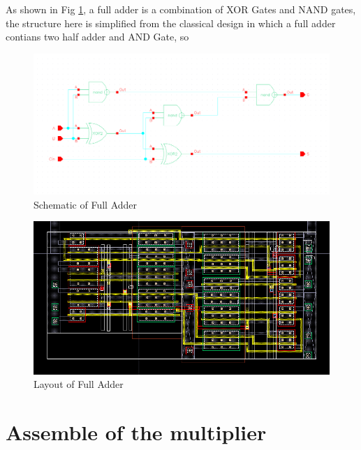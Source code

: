 \documentclass[conference]{IEEEtran}
\begin{document}
As shown in Fig \ref{Schematic of Full Adder}, a full adder is a combination of XOR Gates and NAND gates, the structure here is simplified from the classical design in which a full adder contians two half adder and AND Gate, so 

\begin{figure}[H]
    \centering
    \includegraphics[width = 0.9\linewidth]{full_adder_schematic.png}
    \caption{Schematic of Full Adder}
    \label{Schematic of Full Adder}
\end{figure}
 
\begin{figure}[H]
    \centering
    \includegraphics[width = 0.5\linewidth]{full_adder_layout.png}
    \caption{Layout of Full Adder}
    \label{Layout of Full Adder}
\end{figure}


\section{Assemble of the multiplier}
\label{Assemble}

\end{document}
